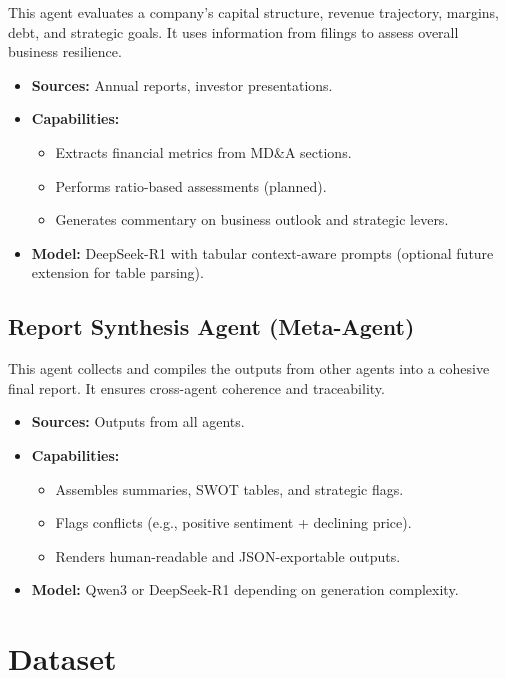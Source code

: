 \documentclass[11pt]{article}
\begin{document}
This agent evaluates a company's capital structure, revenue trajectory, margins, debt, and strategic goals. It uses information from filings to assess overall business resilience.

\begin{itemize}
    \item \textbf{Sources:} Annual reports, investor presentations.
    \item \textbf{Capabilities:}
        \begin{itemize}
            \item Extracts financial metrics from MD\&A sections.
            \item Performs ratio-based assessments (planned).
            \item Generates commentary on business outlook and strategic levers.
        \end{itemize}
    \item \textbf{Model:} DeepSeek-R1 with tabular context-aware prompts (optional future extension for table parsing).
\end{itemize}

\subsection*{Report Synthesis Agent (Meta-Agent)}

This agent collects and compiles the outputs from other agents into a cohesive final report. It ensures cross-agent coherence and traceability.

\begin{itemize}
    \item \textbf{Sources:} Outputs from all agents.
    \item \textbf{Capabilities:}
        \begin{itemize}
            \item Assembles summaries, SWOT tables, and strategic flags.
            \item Flags conflicts (e.g., positive sentiment + declining price).
            \item Renders human-readable and JSON-exportable outputs.
        \end{itemize}
    \item \textbf{Model:} Qwen3 or DeepSeek-R1 depending on generation complexity.
\end{itemize}


\section{Dataset}
\label{sec:dataset}
\end{document}
